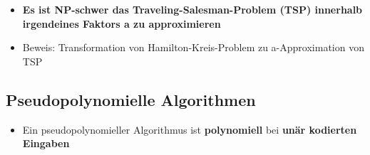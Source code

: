 \begin{itemize}
	\item \textbf{Es ist NP-schwer das Traveling-Salesman-Problem (TSP) innerhalb irgendeines Faktors a zu approximieren}
	\item Beweis: Transformation von Hamilton-Kreis-Problem zu a-Approximation von TSP
\end{itemize}

\subsection{Pseudopolynomielle Algorithmen}%
\label{aa:sub:pseudopolynomielle_algorithmen}

\begin{itemize}
	\item Ein pseudopolynomieller Algorithmus ist \textbf{polynomiell} bei \textbf{unär kodierten Eingaben}
\end{itemize}